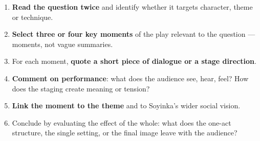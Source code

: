 \documentclass[11pt]{article}
\begin{document}
\begin{methode}
\begin{enumerate}
\item \textbf{Read the question twice} and identify whether it targets character, theme or technique.
\item \textbf{Select three or four key moments} of the play relevant to the question — moments, not vague summaries.
\item For each moment, \textbf{quote a short piece of dialogue or a stage direction}.
\item \textbf{Comment on performance}: what does the audience see, hear, feel? How does the staging create meaning or tension?
\item \textbf{Link the moment to the theme} and to Soyinka's wider social vision.
\item Conclude by evaluating the effect of the whole: what does the one-act structure, the single setting, or the final image leave with the audience?
\end{enumerate}
\end{methode}
\end{document}
